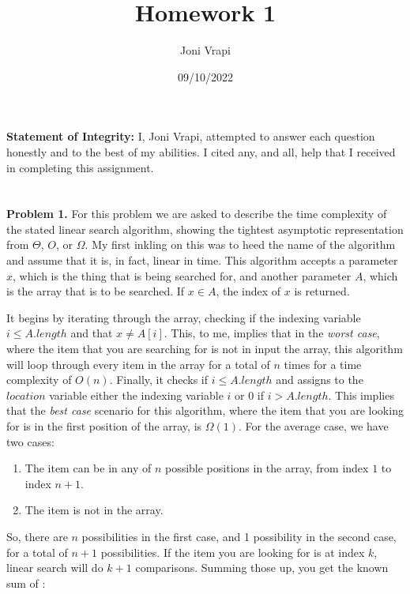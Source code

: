 \documentclass{article}
\title{Homework 1}
\author{Joni Vrapi}
\date{09/10/2022}
\begin{document}
\maketitle

\textbf{Statement of Integrity:} I, Joni Vrapi, attempted to answer each question honestly and to the best of my abilities. I cited any, and all, help that I received in completing this assignment.

\section*{}

\textbf{Problem 1.} For this problem we are asked to describe the time complexity of the stated linear search algorithm, showing the tightest asymptotic representation from $\Theta$, $O$, or $\Omega$. My first inkling on this was to heed the name of the algorithm and assume that it is, in fact, linear in time. This algorithm accepts a parameter $x$, which is the thing that is being searched for, and another parameter $A$, which is the array that is to be searched. If $x \in A$, the index of $x$ is returned. 

It begins by iterating through the array, checking if the indexing variable $i \leq A.length$ and that $x \neq A[i]$. This, to me, implies that in the \emph{worst case}, where the item that you are searching for is not in input the array, this algorithm will loop through every item in the array for a total of $n$ times for a time complexity of $O(n)$. Finally, it checks if $i \leq A.length$ and assigns to the $location$ variable either the indexing variable $i$ or $0$ if $i > A.length$. This implies that the \emph{best case} scenario for this algorithm, where the item that you are looking for is in the first position of the array, is $\Omega(1)$. For the average case, we have two cases:

\begin{enumerate}
    \item The item can be in any of $n$ possible positions in the array, from index $1$ to index $n+1$.
    \item The item is not in the array.
\end{enumerate}

So, there are $n$ possibilities in the first case, and 1 possibility in the second case, for a total of $n+1$ possibilities. If the item you are looking for is at index $k$, linear search will do $k+1$ comparisons. Summing those up, you get the known sum of \cite{website:2}:
\end{document}
